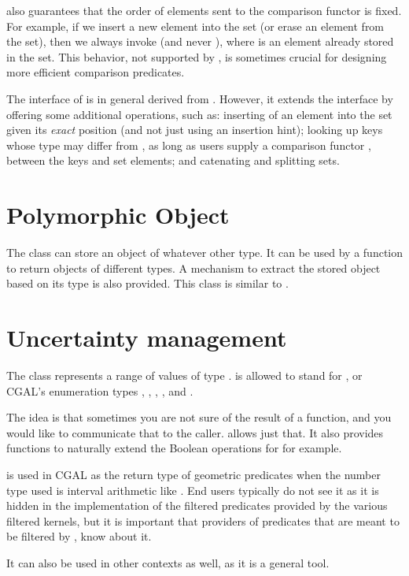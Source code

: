  also guarantees that the order of
elements sent to the comparison functor is fixed. For example, if we insert
a new element  into the set (or erase an element from the set), then
we always invoke  (and never ),
where  is an element already stored in the set. This behavior, not
supported by , is sometimes crucial for designing more
efficient comparison predicates.


The interface of  is in general
derived from . However, it extends the interface by
offering some additional operations, such as: inserting of an element into
the set given its {\em exact} position (and not just using an insertion hint);
looking up keys whose type may differ from , as long as users supply
a comparison functor , between the keys and set elements;
and catenating and splitting sets.

\section{Polymorphic Object}

The class  can store an object of whatever other type.
It can be used by a function to return objects of different types.
A mechanism to extract the stored object based on its type is also provided.
This class is similar to .

\section{Uncertainty management}

The class  represents a range of values of type .
 is allowed to stand for , or CGAL's enumeration types
, , , ,
 and .

The idea is that sometimes you are not sure of the result of a function,
and you would like to communicate that to the caller.  
allows just that.  It also provides functions to naturally extend the
Boolean operations for  for example.

 is used in CGAL as the return type of geometric predicates
when the number type used is interval arithmetic like .
End users typically do not see it as it is hidden in the implementation
of the filtered predicates provided by the various filtered kernels,
but it is important that providers of predicates that are meant to be
filtered by , know about it.

It can also be used in other contexts as well, as it is a general tool.

